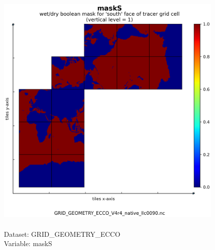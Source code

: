 \begin{figure}[H]
\centering
\includegraphics[scale=0.5]{../images/plots/native_plots_coords/Geometry_Parameters_for_the_Lat-Lon-Cap_90_(llc90)_Native_Model_Grid_(Version_4_Release_4)/maskS.png}
\caption{\\Dataset: GRID\_GEOMETRY\_ECCO\\Variable: maskS}
\label{tab:table-GRID_GEOMETRY_ECCO_maskS-Plot}
\end{figure}